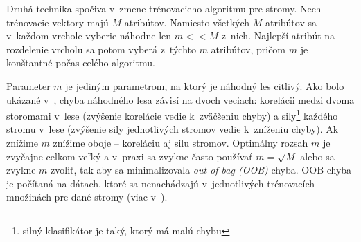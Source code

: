 Druhá technika spočiva v~zmene trénovacieho algoritmu pre stromy. Nech trénovacie vektory majú $M$ atribútov. Namiesto všetkých $M$ atribútov sa v~každom vrchole vyberie náhodne len $m<<M$ z~nich. Najlepší atribút na rozdelenie vrcholu sa potom vyberá z~týchto $m$ atribútov, pričom $m$ je konštantné počas celého algoritmu.


Parameter $m$ je jediným parametrom, na ktorý je náhodný les citlivý. Ako bolo ukázané v~\cite{randomForestPaper}, chyba náhodného lesa závisí na dvoch veciach: korelácii medzi dvoma storomami v~lese (zvýšenie korelácie vedie k~zväčšeniu chyby) a sily\footnote{silný klasifikátor je taký, ktorý má malú chybu} každého stromu v~lese (zvýšenie sily jednotlivých stromov vedie k~zníženiu chyby). Ak znížime $m$ znížime oboje -- koreláciu aj silu stromov. Optimálny rozsah $m$ je zvyčajne celkom veľký a v~praxi sa zvykne často používať $m = \sqrt{M}$ alebo sa zvykne $m$ zvoliť, tak aby sa minimalizovala \textit{out of bag (OOB)} chyba. OOB chyba je počítaná na dátach, ktoré sa nenachádzajú v~jednotlivých trénovacích množinách pre dané stromy (viac v~\cite{randomForest}).



